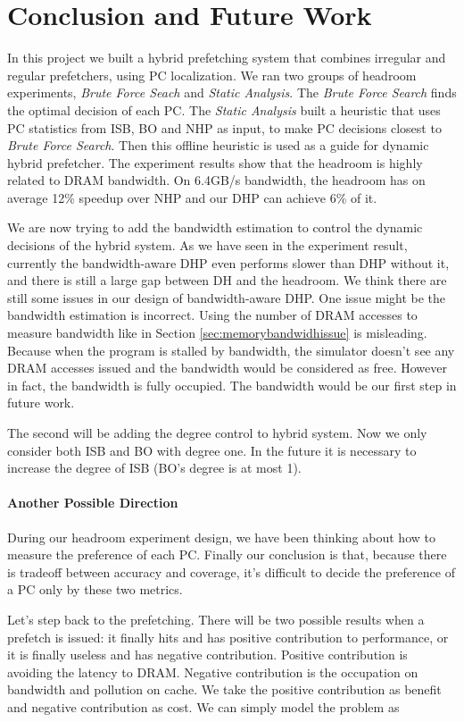 \section{Conclusion and Future Work}
\label{sec:conclusion}

In this project we built a hybrid prefetching system that combines irregular and regular prefetchers, using PC localization. 
We ran two groups of headroom experiments, \emph{Brute Force Seach} and \emph{Static Analysis}. The \emph{Brute Force Search} finds the optimal decision of each PC.  
The \emph{Static Analysis} built a heuristic that uses PC statistics from ISB, BO and NHP as input, to make PC decisions closest to \emph{Brute Force Search}. 
Then this offline heuristic is used as a guide for dynamic hybrid prefetcher. 
The experiment results show that the headroom is highly related to DRAM bandwidth. On 6.4GB/s bandwidth, the headroom has on average 12\% speedup over NHP and our DHP can achieve 6\% of it. \par

We are now trying to add the bandwidth estimation to control the dynamic decisions of the hybrid system. 
As we have seen in the experiment result, currently the bandwidth-aware DHP even performs slower than DHP without it, and there is still a large gap between DH and the headroom. 
We think there are still some issues in our design of bandwidth-aware DHP. One issue might be the bandwidth estimation is incorrect. Using the number of DRAM accesses to measure bandwidth like in Section \ref{sec:memorybandwidhissue} is misleading. Because when the program is stalled by bandwidth, the simulator doesn't see any DRAM accesses issued and the bandwidth would be considered as free. However in fact, the bandwidth is fully occupied. The bandwidth would be our first step in future work. \par

The second will be adding the degree control to hybrid system. Now we only consider both ISB and BO with degree one. In the future it is necessary to increase the degree of ISB (BO's degree is at most 1).\par

\paragraph{Another Possible Direction}
During our headroom experiment design, we have been thinking about how to measure the preference of each PC. Finally our conclusion is that, because there is tradeoff between accuracy and coverage, it's difficult to decide the preference of a PC only by these two metrics. \par
Let's step back to the prefetching. There will be two possible results when a prefetch is issued: it finally hits and has positive contribution to performance, or it is finally useless and has negative contribution. Positive contribution is avoiding the latency to DRAM. Negative contribution is the occupation on bandwidth and pollution on cache. We take the positive contribution as benefit and negative contribution as cost. We can simply model the problem as\par

